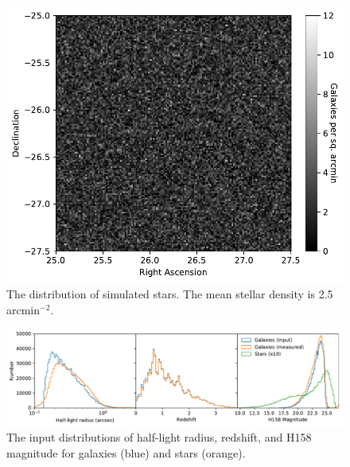 \documentclass[aps,prd, amsmath,amssymb,superscriptaddress,showkeys,nofootinbib,reprint,preprintnumbers]{revtex4-1}
\begin{document}
\begin{figure}
\begin{center}
\includegraphics[width=\columnwidth]{figures/stars.pdf}
\end{center}
\caption[]{
The distribution of simulated stars. The mean stellar density is 2.5 arcmin$^{-2}$. 
\label{fig:stars}}
\end{figure}

\begin{figure}
\begin{center}
\includegraphics[width=\textwidth]{figures/hist.pdf}
\end{center}
\caption[]{
The input distributions of half-light radius, redshift, and H158 magnitude for galaxies (blue) and stars (orange). 
\label{fig:hist}}
\end{figure}
\end{document}
